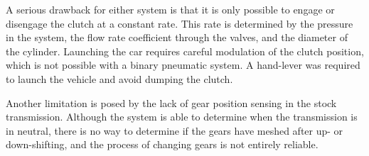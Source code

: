 A serious drawback for either system is that it is only possible to engage or disengage the clutch at a constant rate. This rate is determined by the pressure in the system, the flow rate coefficient through the valves, and the diameter of the cylinder. Launching the car requires careful modulation of the clutch position, which is not possible with a binary pneumatic system. A hand-lever was required to launch the vehicle and avoid dumping the clutch. 

Another limitation is posed by the lack of gear position sensing in the stock transmission. Although the system is able to determine when the transmission is in neutral, there is no way to determine if the gears have meshed after up- or down-shifting, and the process of changing gears is not entirely reliable. 
